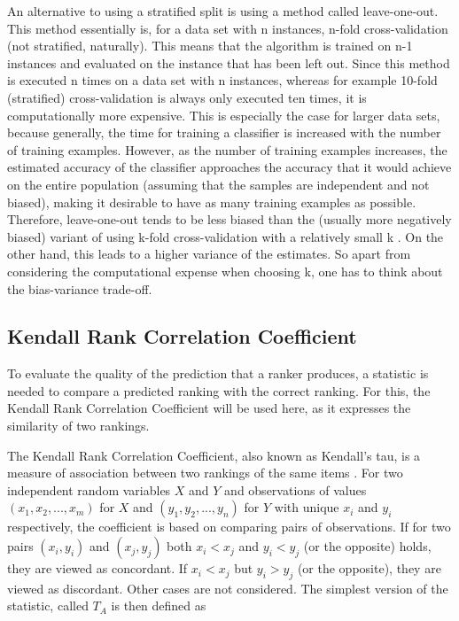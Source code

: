 An alternative to using a stratified split is using a method called leave-one-out. This method essentially is, for a data set with n instances, n-fold cross-validation (not stratified, naturally). This means that the algorithm is trained on n-1 instances and evaluated on the instance that has been left out. Since this method is executed n times on a data set with n instances, whereas for example 10-fold (stratified) cross-validation is always only executed ten times, it is computationally more expensive. This is especially the case for larger data sets, because generally, the time for training a classifier is increased with the number of training examples. However, as the number of training examples increases, the estimated accuracy of the classifier approaches the accuracy that it would achieve on the entire population (assuming that the samples are independent and not biased), making it desirable to have as many training examples as possible. Therefore, leave-one-out tends to be less biased than the (usually more negatively biased) variant of using k-fold cross-validation with a relatively small k \cite{kohavi1995study}. On the other hand, this leads to a higher variance of the estimates. So apart from considering the computational expense when choosing k, one has to think about the bias-variance trade-off.   

\subsection{Kendall Rank Correlation Coefficient}
To evaluate the quality of the prediction that a ranker produces, a statistic is needed to compare a predicted ranking with the correct ranking. For this, the Kendall Rank Correlation Coefficient will be used here, as it expresses the similarity of two rankings.

The Kendall Rank Correlation Coefficient, also known as Kendall's tau, is a measure of association between two rankings of the same items \cite{kendall1938new}. For two independent random variables $X$ and $Y$ and observations of values $(x_1,x_2,...,x_m)$ for $X$ and $(y_1,y_2,...,y_n)$ for $Y$ with unique $x_i$ and $y_i$ respectively, the coefficient is based on comparing pairs of observations. If for two pairs $(x_i,y_i)$ and $(x_j,y_j)$ both $x_i < x_j$ and $y_i < y_j$ (or the opposite) holds, they are viewed as concordant. If $x_i < x_j$ but $y_i > y_j$ (or the opposite), they are viewed as discordant. Other cases are not considered. The simplest version of the statistic, called $T_A$ \cite{Kendall2} is then defined as 

